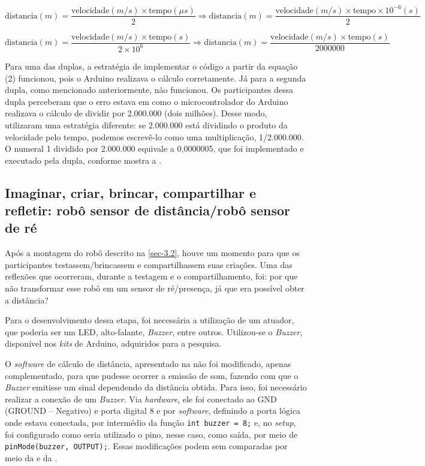 \documentclass{textolivre}
\begin{document}
\begin{small}
\begin{equation}
\text{distancia}(m) = \frac{\text{velocidade}(m/s) \times \text{tempo}(\mu s)}{2} \Rightarrow \text{distancia}(m) = \frac{\text{velocidade}(m/s) \times \text{tempo} \times 10^{-6}(s)}{2} 
\end{equation}

\begin{equation}
\text{distancia}(m) = \frac{\text{velocidade}(m/s) \times \text{tempo}(s)}{2 \times 10^6} \Rightarrow \text{distancia}(m) = \frac{\text{velocidade}(m/s) \times \text{tempo} (s)}{2000000} 
\end{equation}
\end{small}

Para uma das duplas, a estratégia de implementar o código a partir da equação (2) funcionou, pois o Arduino realizava o cálculo corretamente. Já para a segunda dupla, como mencionado anteriormente, não funcionou. Os participantes dessa dupla perceberam que o erro estava em como o microcontrolador do Arduino realizava o cálculo de dividir por 2.000.000 (dois milhões). Desse modo, utilizaram uma estratégia diferente: se 2.000.000 está dividindo o produto da velocidade pelo tempo, podemos escrevê-lo como uma multiplicação, 1/2.000.000. O numeral 1 dividido por 2.000.000 equivale a 0,0000005, que foi implementado e executado pela dupla, conforme mostra a .

\subsection{Imaginar, criar, brincar, compartilhar e refletir: robô sensor de distância/robô sensor de ré}
Após a montagem do robô descrito na \cref{sec-3.2}, houve um momento para que os participantes testassem/brincassem e compartilhassem suas criações. Uma das reflexões que ocorreram, durante a testagem e o compartilhamento, foi: por que não transformar esse robô em um sensor de ré/presença, já que era possível obter a distância?

Para o desenvolvimento dessa etapa, foi necessária a utilização de um atuador, que poderia ser um LED, alto-falante, \emph{Buzzer}, entre outros. Utilizou-se o \emph{Buzzer}, disponível nos \emph{kits} de Arduino, adquiridos para a pesquisa.

O \emph{software} de cálculo de distância, apresentado na  não foi modificado, apenas complementado, para que pudesse ocorrer a emissão de som, fazendo com que o \emph{Buzzer} emitisse um sinal dependendo da distância obtida. Para isso, foi necessário realizar a conexão de um \emph{Buzzer}. Via \emph{hardware}, ele foi conectado ao GND (GROUND – Negativo) e porta digital 8 e por \emph{software}, definindo a porta lógica onde estava conectada, por intermédio da função \lstinline{int buzzer = 8;} e, no \emph{setup}, foi configurado como seria utilizado o pino, nesse caso, como saída, por meio de \lstinline{pinMode(buzzer, OUTPUT);}. Essas modificações podem sem comparadas por meio da  e da .
\end{document}
